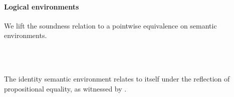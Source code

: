 \documentclass[sigplan,screen]{acmart}
\begin{document}
\paragraph{Logical environments}
We lift the soundness relation to a pointwise equivalence on semantic environments.

\begin{AgdaAlign}
\begin{code}%
%
\>[2]\AgdaSpace{}%
\AgdaSymbol{:}\AgdaSpace{}%
\AgdaSymbol{(}\AgdaSpace{}%
\AgdaSpace{}%
\AgdaSymbol{:}\AgdaSpace{}%
\AgdaSpace{}%
\AgdaSpace{}%
\AgdaSymbol{)}\AgdaSpace{}%
\AgdaSpace{}%
\<%
\\
%
\>[2]\AgdaSpace{}%
\AgdaSymbol{\{}\AgdaSpace{}%
\AgdaSymbol{=}\AgdaSpace{}%
\AgdaSymbol{\}}\AgdaSpace{}%
\AgdaSpace{}%
\AgdaSpace{}%
\AgdaSymbol{=}\<%
\\
\>[2][@{}l@{\AgdaIndent{0}}]%
\>[4]\AgdaSpace{}%
\AgdaSymbol{\{}\AgdaSymbol{\}}\AgdaSpace{}%
\AgdaSymbol{(}\AgdaSpace{}%
\AgdaSymbol{:}\AgdaSpace{}%
\AgdaSpace{}%
\AgdaSpace{}%
\AgdaSymbol{)}\AgdaSpace{}%
\AgdaSpace{}%
\AgdaSpace{}%
\AgdaSpace{}%
\AgdaSpace{}%
\AgdaSpace{}%
\<%
\end{code}
\end{AgdaAlign}

\Ni  The identity semantic environment relates to itself under the reflection of propositional equality, as witnessed by . 

\begin{AgdaAlign}
\begin{code}[hide]%
%
\>[2]\AgdaSpace{}%
\AgdaModule{\AgdaUnderscore{}}\AgdaSpace{}%
\AgdaSymbol{\{}\AgdaSpace{}%
\AgdaSymbol{:}\AgdaSpace{}%
\AgdaSymbol{\}}\AgdaSpace{}%
\<%
\\
\>[2][@{}l@{\AgdaIndent{0}}]%
\>[4]\AgdaSpace{}%
\AgdaSymbol{=}\AgdaSpace{}%
\AgdaSpace{}%
\AgdaSymbol{\{}\AgdaSymbol{\}}\<%
\end{code}
\begin{code}%
%
\>[4]\AgdaSpace{}%
\AgdaSymbol{:}\AgdaSpace{}%
\AgdaSpace{}%
\AgdaSpace{}%
\<%
\\
%
\>[4]\AgdaSpace{}%
\AgdaSymbol{\AgdaUnderscore{}}\AgdaSpace{}%
\AgdaSymbol{=}\AgdaSpace{}%
\AgdaSpace{}%
\<%
\end{code}
\end{AgdaAlign}
\end{document}

